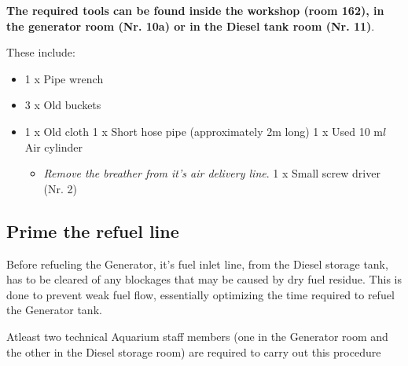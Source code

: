 \documentclass[
  letterpaper,
  DIV=11,
  numbers=noendperiod]{scrreprt}
\providecommand{\tightlist}{%
  \setlength{\itemsep}{0pt}\setlength{\parskip}{0pt}}\usepackage{longtable,booktabs,array}
\begin{document}
\textbf{The required tools can be found inside the workshop (room 162),
in the generator room (Nr. 10a) or in the Diesel tank room (Nr. 11)}.

These include:

\begin{itemize}
\tightlist
\item
  1 x Pipe wrench
\item
  3 x Old buckets
\item
  1 x Old cloth 1 x Short hose pipe (approximately 2m long) 1 x Used 10
  m\(l\) Air cylinder

  \begin{itemize}
  \tightlist
  \item
    \emph{Remove the breather from it's air delivery line}. 1 x Small
    screw driver (Nr. 2)
  \end{itemize}
\end{itemize}

\hypertarget{prime-the-refuel-line}{%
\subsection{Prime the refuel line}\label{prime-the-refuel-line}}

Before refueling the Generator, it's fuel inlet line, from the Diesel
storage tank, has to be cleared of any blockages that may be caused by
dry fuel residue. This is done to prevent weak fuel flow, essentially
optimizing the time required to refuel the Generator tank.

{Atleast two technical Aquarium staff members (one in the Generator room
and the other in the Diesel storage room) are required to carry out this
procedure}
\end{document}

